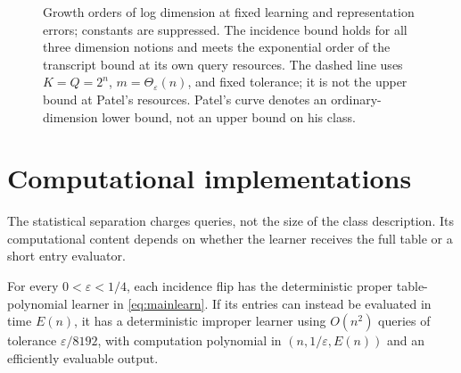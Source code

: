 \documentclass[11pt,letterpaper,pmlr,twoside]{jmlr}
\newcommand{\eps}{\varepsilon}
\begin{document}
\begin{figure}[t]
\centering
{}
\caption{Growth orders of log dimension at fixed learning and representation errors; constants are suppressed. The incidence bound holds for all three dimension notions and meets the exponential order of the transcript bound at its own query resources. The dashed line uses $K=Q=2^n$, $m=\Theta_\eps(n)$, and fixed tolerance; it is not the upper bound at Patel's resources. Patel's curve denotes an ordinary-dimension lower bound, not an upper bound on his class.}
\label{fig:parameters}
\end{figure}



\section{Computational implementations}\label{sec:computation}
The statistical separation charges queries, not the size of the class description. Its computational content depends on whether the learner receives the full table or a short entry evaluator.

\begin{theorem}\label{thm:table}
For every $0<\eps<1/4$, each incidence flip has the deterministic proper table-polynomial learner in \eqref{eq:mainlearn}. If its entries can instead be evaluated in time $E(n)$, it has a deterministic improper learner using $O(n^2)$ queries of tolerance $\eps/8192$, with computation polynomial in $(n,1/\eps,E(n))$ and an efficiently evaluable output.
\end{theorem}
\end{document}
